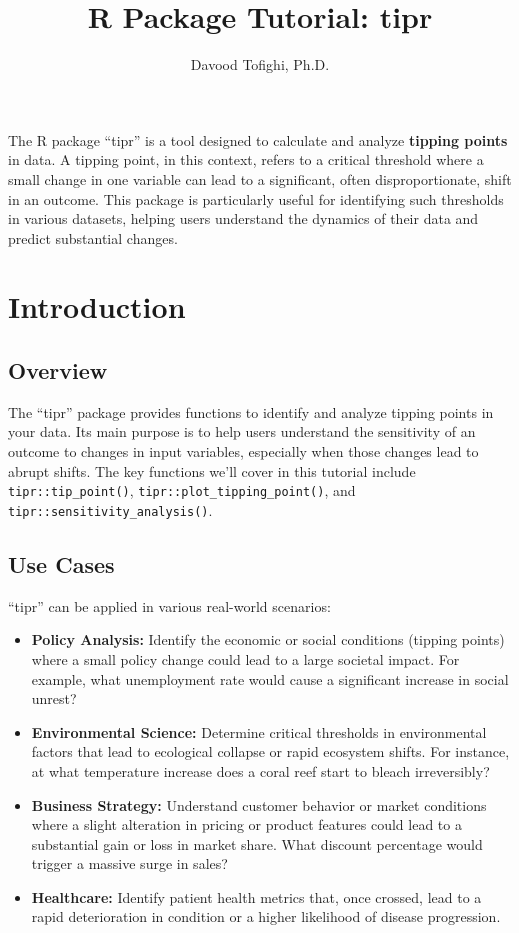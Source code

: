 \documentclass[
  10pt,
  letterpaper,
  DIV=11,
  numbers=noendperiod]{scrartcl}
\title{R Package Tutorial: tipr}
\author{Davood Tofighi, Ph.D.}
\date{}
\providecommand{\tightlist}{%
  \setlength{\itemsep}{0pt}\setlength{\parskip}{0pt}}
\begin{document}
\maketitle


The R package ``tipr'' is a tool designed to calculate and analyze
\textbf{tipping points} in data. A tipping point, in this context,
refers to a critical threshold where a small change in one variable can
lead to a significant, often disproportionate, shift in an outcome. This
package is particularly useful for identifying such thresholds in
various datasets, helping users understand the dynamics of their data
and predict substantial changes.

\section{Introduction}\label{introduction}

\subsection{Overview}\label{overview}

The ``tipr'' package provides functions to identify and analyze tipping
points in your data. Its main purpose is to help users understand the
sensitivity of an outcome to changes in input variables, especially when
those changes lead to abrupt shifts. The key functions we'll cover in
this tutorial include \texttt{tipr::tip\_point()},
\texttt{tipr::plot\_tipping\_point()}, and
\texttt{tipr::sensitivity\_analysis()}.

\subsection{Use Cases}\label{use-cases}

``tipr'' can be applied in various real-world scenarios:

\begin{itemize}
\tightlist
\item
  \textbf{Policy Analysis:} Identify the economic or social conditions
  (tipping points) where a small policy change could lead to a large
  societal impact. For example, what unemployment rate would cause a
  significant increase in social unrest?
\item
  \textbf{Environmental Science:} Determine critical thresholds in
  environmental factors that lead to ecological collapse or rapid
  ecosystem shifts. For instance, at what temperature increase does a
  coral reef start to bleach irreversibly?
\item
  \textbf{Business Strategy:} Understand customer behavior or market
  conditions where a slight alteration in pricing or product features
  could lead to a substantial gain or loss in market share. What
  discount percentage would trigger a massive surge in sales?
\item
  \textbf{Healthcare:} Identify patient health metrics that, once
  crossed, lead to a rapid deterioration in condition or a higher
  likelihood of disease progression.
\end{itemize}
\end{document}
